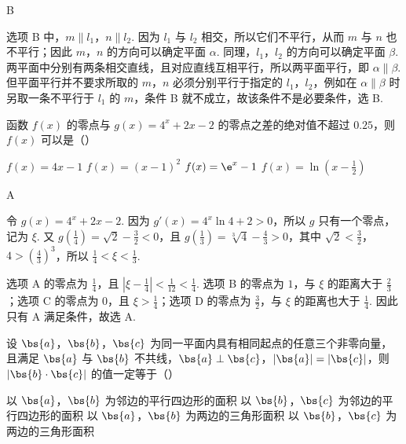 \begin{answer}
B
\end{answer}

\begin{solution}
选项 B 中，\(m\parallel l_1\)，\(n\parallel l_2\). 因为 \(l_1\) 与 \(l_2\) 相交，所以它们不平行，从而 \(m\) 与 \(n\) 也不平行；因此 \(m\)，\(n\) 的方向可以确定平面 \(\alpha\). 同理，\(l_1\)，\(l_2\) 的方向可以确定平面 \(\beta\). 两平面中分别有两条相交直线，且对应直线互相平行，所以两平面平行，即 \(\alpha\parallel\beta\). 但平面平行并不要求所取的 \(m\)，\(n\) 必须分别平行于指定的 \(l_1\)，\(l_2\)，例如在 \(\alpha\parallel\beta\) 时另取一条不平行于 \(l_1\) 的 \(m\)，条件 B 就不成立，故该条件不是必要条件，选 B.
\end{solution}

\begin{problem}
函数 \(f(x)\) 的零点与 \(g(x) = 4^x + 2x - 2\) 的零点之差的绝对值不超过 \(0.25\)，则 \(f(x)\) 可以是（\quad）

\choices
    {\(f(x) = 4x - 1\)}
    {\(f(x) = (x - 1)^{2}\)}
    {\(f(x) = \e^{x} - 1\)}
    {\(f(x) = \ln \left(x - \frac{1}{2}\right)\)}
\end{problem}

\begin{answer}
A
\end{answer}

\begin{solution}
令 \(g(x)=4^x+2x-2\). 因为 \(g'(x)=4^x\ln4+2>0\)，所以 \(g\) 只有一个零点，记为 \(\xi\). 又 \(g\left(\frac14\right)=\sqrt2-\frac32<0\)，且 \(g\left(\frac13\right)=\sqrt[3]{4}-\frac43>0\)，其中 \(\sqrt2<\frac32\)，\(4>\left(\frac43\right)^3\)，所以 \(\frac14<\xi<\frac13\).

选项 A 的零点为 \(\frac14\)，且 \(\left|\xi-\frac14\right|<\frac1{12}<\frac14\). 选项 B 的零点为 \(1\)，与 \(\xi\) 的距离大于 \(\frac23\)；选项 C 的零点为 \(0\)，且 \(\xi>\frac14\)；选项 D 的零点为 \(\frac32\)，与 \(\xi\) 的距离也大于 \(\frac14\). 因此只有 A 满足条件，故选 A.
\end{solution}

\begin{problem}
设 \(\bs{a}\)，\(\bs{b}\)，\(\bs{c}\) 为同一平面内具有相同起点的任意三个非零向量，且满足 \(\bs{a}\) 与 \(\bs{b}\) 不共线，\(\bs{a} \perp \bs{c}\)，\(|\bs{a}| = |\bs{c}|\)，则 \(|\bs{b} \cdot \bs{c}|\) 的值一定等于（\quad）

\choices
    {以 \(\bs{a}\)，\(\bs{b}\) 为邻边的平行四边形的面积}
    {以 \(\bs{b}\)，\(\bs{c}\) 为邻边的平行四边形的面积}
    {以 \(\bs{a}\)，\(\bs{b}\) 为两边的三角形面积}
    {以 \(\bs{b}\)，\(\bs{c}\) 为两边的三角形面积}
\end{problem}

